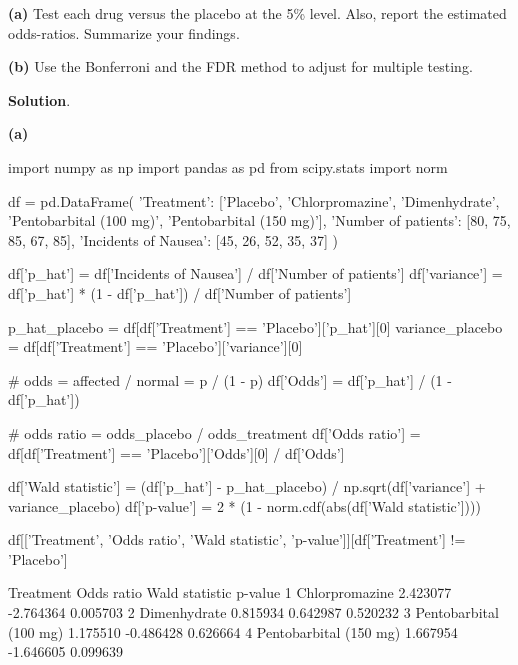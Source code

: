 \textbf{(a)} Test each drug versus the placebo at the 5\% level. Also,
report the estimated odds-ratios. Summarize your findings.

\textbf{(b)} Use the Bonferroni and the FDR method to adjust for
multiple testing.

\textbf{Solution}.

\textbf{(a)}

\begin{python}
import numpy as np
import pandas as pd
from scipy.stats import norm

df = pd.DataFrame({
    'Treatment': ['Placebo', 'Chlorpromazine', 'Dimenhydrate', 'Pentobarbital (100 mg)', 'Pentobarbital (150 mg)'],
    'Number of patients': [80, 75, 85, 67, 85],
    'Incidents of Nausea': [45, 26, 52, 35, 37]
})
\end{python}

\begin{python}
df['p_hat'] = df['Incidents of Nausea'] / df['Number of patients']
df['variance'] = df['p_hat'] * (1 - df['p_hat']) / df['Number of patients']
\end{python}

\begin{python}
p_hat_placebo = df[df['Treatment'] == 'Placebo']['p_hat'][0]
variance_placebo = df[df['Treatment'] == 'Placebo']['variance'][0]

# odds = affected / normal = p / (1 - p)
df['Odds'] = df['p_hat'] / (1 - df['p_hat'])

# odds ratio = odds_placebo / odds_treatment
df['Odds ratio'] = df[df['Treatment'] == 'Placebo']['Odds'][0] / df['Odds']

df['Wald statistic'] = (df['p_hat'] - p_hat_placebo) / np.sqrt(df['variance'] + variance_placebo)
df['p-value'] = 2 * (1 - norm.cdf(abs(df['Wald statistic'])))
\end{python}

\begin{python}
df[['Treatment', 'Odds ratio', 'Wald statistic', 'p-value']][df['Treatment'] != 'Placebo']
\end{python}

\begin{console}
                Treatment  Odds ratio  Wald statistic   p-value
1          Chlorpromazine    2.423077       -2.764364  0.005703
2            Dimenhydrate    0.815934        0.642987  0.520232
3  Pentobarbital (100 mg)    1.175510       -0.486428  0.626664
4  Pentobarbital (150 mg)    1.667954       -1.646605  0.099639
\end{console}
        
